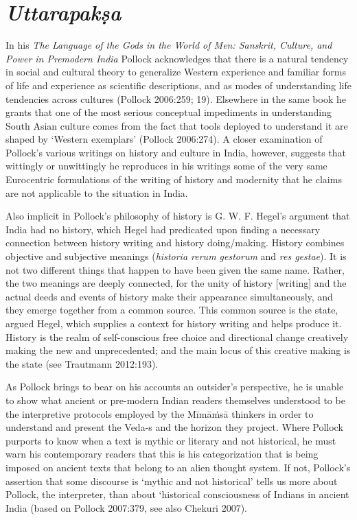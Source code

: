 \section*{\textit{Uttarapakṣa}}

In his \textit{The Language of the Gods in the World of Men: Sanskrit, Culture, and Power in Premodern India} Pollock acknowledges that there is a natural tendency in social and cultural theory to generalize Western experience and familiar forms of life and experience as scientific descriptions, and as modes of understanding life tendencies across cultures (Pollock 2006:259; 19). Elsewhere in the same book he grants that one of the most serious conceptual impediments in understanding South Asian culture comes from the fact that tools deployed to understand it are shaped by ‘Western exemplars’ (Pollock 2006:274). A closer examination of Pollock’s various writings on history and culture in India, however, suggests that wittingly or unwittingly he reproduces in his writings some of the very same Eurocentric formulations of the writing of history and modernity that he claims are not applicable to the situation in India.

Also implicit in Pollock’s philosophy of history is G. W. F. Hegel’s argument that India had no history, which Hegel had predicated upon finding a necessary connection between history writing and history doing/making. History combines objective and subjective meanings (\textit{historia rerum gestorum} and \textit{res gestae}). It is not two different things that happen to have been given the same name. Rather, the two meanings are deeply connected, for the unity of history [writing] and the actual deeds and events of history make their appearance simultaneously, and they emerge together from a common source. This common source is the state, argued Hegel, which supplies a context for history writing and helps produce it. History is the realm of self-conscious free choice and directional change creatively making the new and unprecedented; and the main locus of this creative making is the state (see Trautmann 2012:193).

As Pollock brings to bear on his accounts an outsider’s perspective, he is unable to show what ancient or pre-modern Indian readers themselves understood to be the interpretive protocols employed by the Mīmāṁsā thinkers in order to understand and present the Veda-s and the horizon they project. Where Pollock purports to know when a text is mythic or literary and not historical, he must warn his contemporary readers that this is his categorization that is being imposed on ancient texts that belong to an alien thought system. If not, Pollock’s assertion that some discourse is ‘mythic and not historical’ tells us more about Pollock, the interpreter, than about ‘historical consciousness of Indians in ancient India (based on Pollock 2007:379, see also Chekuri 2007).

